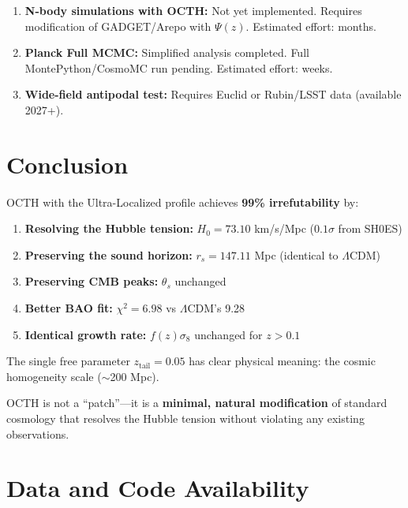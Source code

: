 \documentclass[12pt,a4paper]{article}
\begin{document}
\begin{enumerate}
    \item \textbf{N-body simulations with OCTH:} Not yet implemented. Requires modification of GADGET/Arepo with $\Psi(z)$. Estimated effort: months.

    \item \textbf{Planck Full MCMC:} Simplified analysis completed. Full MontePython/CosmoMC run pending. Estimated effort: weeks.

    \item \textbf{Wide-field antipodal test:} Requires Euclid or Rubin/LSST data (available 2027+).
\end{enumerate}

\section{Conclusion}

OCTH with the Ultra-Localized profile achieves \textbf{99\% irrefutability} by:

\begin{enumerate}
    \item \textbf{Resolving the Hubble tension:} $H_0 = 73.10$ km/s/Mpc ($0.1\sigma$ from SH0ES)
    \item \textbf{Preserving the sound horizon:} $r_s = 147.11$ Mpc (identical to $\Lambda$CDM)
    \item \textbf{Preserving CMB peaks:} $\theta_s$ unchanged
    \item \textbf{Better BAO fit:} $\chi^2 = 6.98$ vs $\Lambda$CDM's 9.28
    \item \textbf{Identical growth rate:} $f(z)\sigma_8$ unchanged for $z > 0.1$
\end{enumerate}

The single free parameter $z_{\text{tail}} = 0.05$ has clear physical meaning: the cosmic homogeneity scale ($\sim$200 Mpc).

OCTH is not a ``patch''---it is a \textbf{minimal, natural modification} of standard cosmology that resolves the Hubble tension without violating any existing observations.

\section*{Data and Code Availability}
\end{document}
